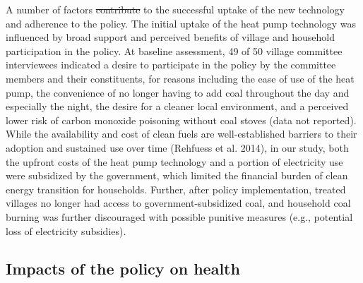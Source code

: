 \documentclass[
  letterpaper,
  DIV=11,
  numbers=noendperiod]{scrartcl}
\makeatletter
\providecommand{\DIFadd}[1]{{\protect\color{blue}\uwave{#1}}} %
\providecommand{\DIFdel}[1]{{\protect\color{red}\sout{#1}}} %
\providecommand{\DIFaddbegin}{} %
\providecommand{\DIFaddend}{} %
\providecommand{\DIFdelbegin}{} %
\providecommand{\DIFdelend}{} %
\newcommand{\DIFscaledelfig}{0.5}
\newlength{\DIFdelgraphicswidth} %
\newlength{\DIFdelgraphicsheight} %
\newcommand{\DIFaddincludegraphics}[2][]{{\color{blue}\fbox{\DIFOincludegraphics[#1]{#2}}}} %
\newcommand{\DIFdelincludegraphics}[2][]{%
\sbox{\DIFdelgraphicsbox}{\DIFOincludegraphics[#1]{#2}}%
\settoboxwidth{\DIFdelgraphicswidth}{\DIFdelgraphicsbox} %
\settoboxtotalheight{\DIFdelgraphicsheight}{\DIFdelgraphicsbox} %
\scalebox{\DIFscaledelfig}{%
\parbox[b]{\DIFdelgraphicswidth}{\usebox{\DIFdelgraphicsbox}\\[-\baselineskip] \rule{\DIFdelgraphicswidth}{0em}}\llap{\resizebox{\DIFdelgraphicswidth}{\DIFdelgraphicsheight}{%
\setlength{\unitlength}{\DIFdelgraphicswidth}%
\begin{picture}(1,1)%
\thicklines\linethickness{2pt} %
{\color[rgb]{1,0,0}\put(0,0){\framebox(1,1){}}}%
{\color[rgb]{1,0,0}\put(0,0){\line( 1,1){1}}}%
{\color[rgb]{1,0,0}\put(0,1){\line(1,-1){1}}}%
\end{picture}%
}\hspace*{3pt}}} %
} %
\DeclareRobustCommand{\DIFaddbegin}{\DIFOaddbegin \let\includegraphics\DIFaddincludegraphics} %
\DeclareRobustCommand{\DIFaddend}{\DIFOaddend \let\includegraphics\DIFOincludegraphics} %
\DeclareRobustCommand{\DIFdelbegin}{\DIFOdelbegin \let\includegraphics\DIFdelincludegraphics} %
\DeclareRobustCommand{\DIFdelend}{\DIFOaddend \let\includegraphics\DIFOincludegraphics} %
\let\sout@orig\sout %
\renewcommand{\sout}[1]{\ifmmode\text{\sout@orig{\ensuremath{#1}}}\else\sout@orig{#1}\fi} %
\makeatother
\begin{document}
A number of factors \DIFdelbegin \DIFdel{contribute }\DIFdelend \DIFaddbegin \DIFadd{contributed }\DIFaddend to the successful uptake of the new
technology and adherence to the policy. The initial uptake of the heat
pump technology was influenced by broad support and perceived benefits
of village and household participation in the policy. At baseline
assessment, 49 of 50 village committee interviewees indicated a desire
to participate in the policy by the committee members and their
constituents, for reasons including the ease of use of the heat pump,
the convenience of no longer having to add coal throughout the day and
especially the night, the desire for a cleaner local environment, and a
perceived lower risk of carbon monoxide poisoning without coal stoves
(data not reported). While the availability and cost of clean fuels are
well-established barriers to their adoption and sustained use over time
(Rehfuess et al. 2014), in our study, both the upfront costs of the heat
pump technology and a portion of electricity use were subsidized by the
government, which limited the financial burden of clean energy
transition for households. Further, after policy implementation, treated
villages no longer had access to government-subsidized coal, and
household coal burning was further discouraged with possible punitive
measures (e.g., potential loss of electricity subsidies).

\subsection{Impacts of the policy on
health}\label{impacts-of-the-policy-on-health}
\end{document}

